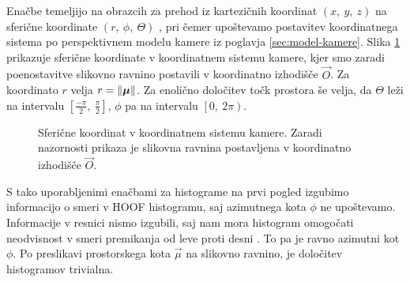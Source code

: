 Enačbe temeljijo na obrazcih za prehod iz kartezičnih koordinat $(x, ~y, ~z)$ na sferične koordinate $(r,~\phi,~\Theta)$ \cite{bronstein1990math}, pri čemer upoštevamo postavitev koordinatnega sistema po perspektivnem modelu kamere iz poglavja \ref{sec:model-kamere}. Slika \ref{fig:sphere} prikazuje sferične koordinate v koordinatnem sistemu kamere, kjer smo zaradi poenostavitve slikovno ravnino postavili v koordinatno izhodišče $\vec{O}$. Za koordinato $r$ velja $r=\left\lVert {\boldsymbol{\mu}} \right\rVert$. Za enolično določitev točk prostora še velja, da $\Theta$ leži na intervalu $\left[\frac{-\pi}{2},~\frac{\pi}{2}\right]$, $\phi$ pa na intervalu $\left[0,~2\pi\right)$.

\begin{figure}[htb]
	\centering
	
	\caption[Sferične koordinate v koordinatnem sistemu kamere]{Sferične koordinat v koordinatnem sistemu kamere. Zaradi nazornosti prikaza je slikovna ravnina postavljena v koordinatno izhodišče $\vec{O}$.}
	\label{fig:sphere}
\end{figure}

S tako uporabljenimi enačbami za histograme na prvi pogled izgubimo informacijo o smeri v HOOF histogramu, saj azimutnega kota $\phi$ ne upoštevamo. Informacije v resnici nismo izgubili, saj nam mora histogram omogočati neodvisnost v smeri premikanja od leve proti desni \cite{chaudhry2009histograms}. To pa je ravno azimutni kot $\phi$. Po preslikavi prostorskega kota $\vec{\mu}$ na slikovno ravnino, je določitev histogramov trivialna. 
